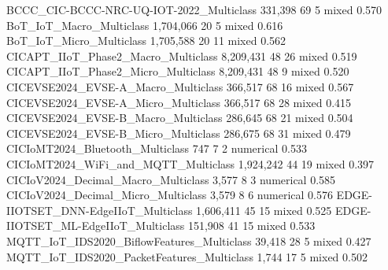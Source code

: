 BCCC_CIC-BCCC-NRC-UQ-IOT-2022_Multiclass                               331,398       69       5         mixed   0.570
BoT_IoT_Macro_Multiclass                                             1,704,066       20       5         mixed   0.616
BoT_IoT_Micro_Multiclass                                             1,705,588       20      11         mixed   0.562
CICAPT_IIoT_Phase2_Macro_Multiclass                                  8,209,431       48      26         mixed   0.519
CICAPT_IIoT_Phase2_Micro_Multiclass                                  8,209,431       48       9         mixed   0.520
CICEVSE2024_EVSE-A_Macro_Multiclass                                    366,517       68      16         mixed   0.567
CICEVSE2024_EVSE-A_Micro_Multiclass                                    366,517       68      28         mixed   0.415
CICEVSE2024_EVSE-B_Macro_Multiclass                                    286,645       68      21         mixed   0.504
CICEVSE2024_EVSE-B_Micro_Multiclass                                    286,675       68      31         mixed   0.479
CICIoMT2024_Bluetooth_Multiclass                                           747        7       2     numerical   0.533
CICIoMT2024_WiFi_and_MQTT_Multiclass                                 1,924,242       44      19         mixed   0.397
CICIoV2024_Decimal_Macro_Multiclass                                      3,577        8       3     numerical   0.585
CICIoV2024_Decimal_Micro_Multiclass                                      3,579        8       6     numerical   0.576
EDGE-IIOTSET_DNN-EdgeIIoT_Multiclass                                 1,606,411       45      15         mixed   0.525
EDGE-IIOTSET_ML-EdgeIIoT_Multiclass                                    151,908       41      15         mixed   0.533
MQTT_IoT_IDS2020_BiflowFeatures_Multiclass                              39,418       28       5         mixed   0.427
MQTT_IoT_IDS2020_PacketFeatures_Multiclass                               1,744       17       5         mixed   0.502
